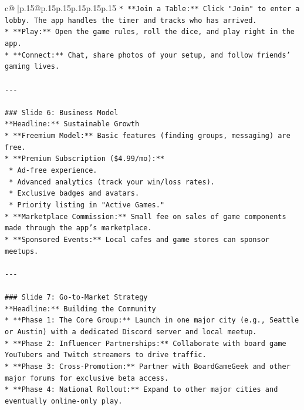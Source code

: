 \documentclass{article}
\begin{document}
{\begin{supertabular}{c@{$\;$}|p{.15\linewidth}@{}p{.15\linewidth}p{.15\linewidth}p{.15\linewidth}p{.15\linewidth}p{.15\linewidth}}
{{{\texttt{*   **Join a Table:** Click "Join" to enter a lobby. The app handles the timer and tracks who has arrived.} \\
\texttt{*   **Play:** Open the game rules, roll the dice, and play right in the app.} \\
\texttt{*   **Connect:** Chat, share photos of your setup, and follow friends' gaming lives.} \\
\\ 
\texttt{{-}{-}{-}} \\
\\ 
\texttt{\#\#\# Slide 6: Business Model} \\
\texttt{**Headline:** Sustainable Growth} \\
\texttt{*   **Freemium Model:** Basic features (finding groups, messaging) are free.} \\
\texttt{*   **Premium Subscription (\$4.99/mo):**} \\
\texttt{    *   Ad{-}free experience.} \\
\texttt{    *   Advanced analytics (track your win/loss rates).} \\
\texttt{    *   Exclusive badges and avatars.} \\
\texttt{    *   Priority listing in "Active Games."} \\
\texttt{*   **Marketplace Commission:** Small fee on sales of game components made through the app's marketplace.} \\
\texttt{*   **Sponsored Events:** Local cafes and game stores can sponsor meetups.} \\
\\ 
\texttt{{-}{-}{-}} \\
\\ 
\texttt{\#\#\# Slide 7: Go{-}to{-}Market Strategy} \\
\texttt{**Headline:** Building the Community} \\
\texttt{*   **Phase 1: The Core Group:** Launch in one major city (e.g., Seattle or Austin) with a dedicated Discord server and local meetup.} \\
\texttt{*   **Phase 2: Influencer Partnerships:** Collaborate with board game YouTubers and Twitch streamers to drive traffic.} \\
\texttt{*   **Phase 3: Cross{-}Promotion:** Partner with BoardGameGeek and other major forums for exclusive beta access.} \\
\texttt{*   **Phase 4: National Rollout:** Expand to other major cities and eventually online{-}only play.} \\
}}}
\end{supertabular}}
\end{document}
